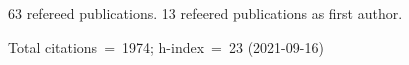 63 refereed publications. 13 refeered publications as first author.

Total citations~=~1974; h-index~=~23 (2021-09-16)